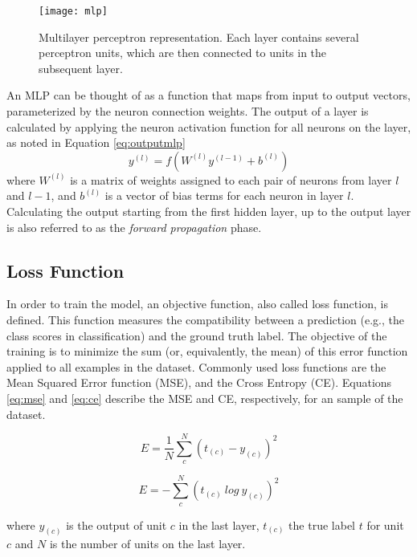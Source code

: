 \begin{figure}[!htb]
\centering
\texttt{[image: mlp]}
\caption{Multilayer perceptron representation. Each layer contains several perceptron units, which are then connected to units in the subsequent layer.}
\label{mlp}
\end{figure}

An MLP can be thought of as a function that maps from input to output vectors, parameterized by the neuron connection weights. The output of a layer
is calculated by applying the neuron activation function for all neurons on the layer, as
noted in Equation \ref{eq:outputmlp}
\begin{equation}
y^{(l)} = f(W^{(l)} y^{(l-1)} + b^{(l)})
\label{eq:outputmlp}
\end{equation}
where $W^{(l)}$ is a matrix of weights assigned to each pair of neurons from layer $l$ and $l-1$, and $b^{(l)}$ is a vector of bias terms for each neuron in layer $l$. Calculating the output starting from the first hidden layer, up to the output layer is also referred to as the \textit{forward propagation} phase.

\subsection{Loss Function}
In order to train the model, an objective function, also called loss function, is defined.
This function measures the compatibility between a prediction (e.g., the class scores in classification) and the ground truth label. The
objective of the training is to minimize the sum (or, equivalently, the mean) of
this error function applied to all examples in the dataset. Commonly used loss functions
are the Mean Squared Error function (MSE), and the Cross Entropy (CE). Equations \ref{eq:mse} and \ref{eq:ce} describe the MSE and CE, respectively, for an sample of the dataset.

\begin{equation}
E =  \frac{1}{N} \sum_{c}^{N} (t_{(c)} - y^{}_{(c)} )^2 
\label{eq:mse}
\end{equation}

\begin{equation}
E = - \sum_{c}^{N} (t_{(c)} \: log \: y^{}_{(c)} )^2 
\label{eq:ce}
\end{equation}

where $y^{}_{(c)}$ is the output of unit $c$ in the last layer, $t_{(c)}$
the true label $t$ for unit $c$ and $N$ is the number of units on the last layer.
